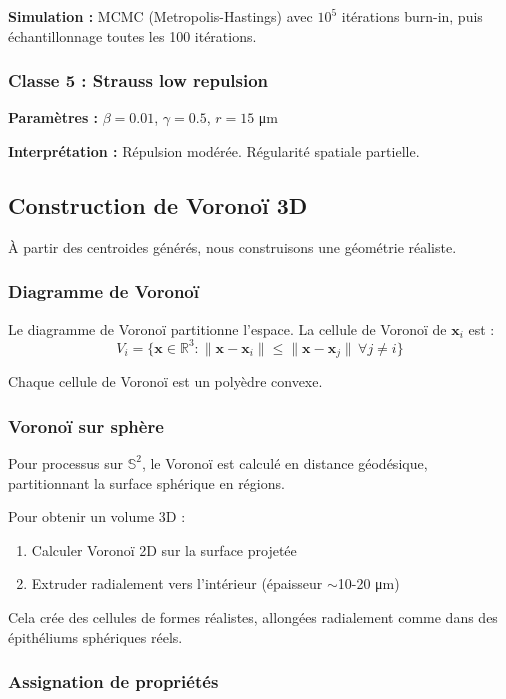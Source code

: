 \textbf{Simulation :}
MCMC (Metropolis-Hastings) avec $10^5$ itérations burn-in, puis échantillonnage toutes les 100 itérations.

\subsubsection{Classe 5 : Strauss low repulsion}

\textbf{Paramètres :} $\beta = 0.01$, $\gamma = 0.5$, $r = 15$ μm

\textbf{Interprétation :} Répulsion modérée. Régularité spatiale partielle.

\subsection{Construction de Voronoï 3D}

À partir des centroides générés, nous construisons une géométrie réaliste.

\subsubsection{Diagramme de Voronoï}

Le diagramme de Voronoï partitionne l'espace. La cellule de Voronoï de $\mathbf{x}_i$ est :
\[
V_i = \{\mathbf{x} \in \mathbb{R}^3 : \|\mathbf{x} - \mathbf{x}_i\| \leq \|\mathbf{x} - \mathbf{x}_j\| \, \forall j \neq i\}
\]

Chaque cellule de Voronoï est un polyèdre convexe.

\subsubsection{Voronoï sur sphère}

Pour processus sur $\mathbb{S}^2$, le Voronoï est calculé en distance géodésique, partitionnant la surface sphérique en régions.

Pour obtenir un volume 3D :
\begin{enumerate}
    \item Calculer Voronoï 2D sur la surface projetée
    \item Extruder radialement vers l'intérieur (épaisseur $\sim$10-20 μm)
\end{enumerate}

Cela crée des cellules de formes réalistes, allongées radialement comme dans des épithéliums sphériques réels.

\subsubsection{Assignation de propriétés}

